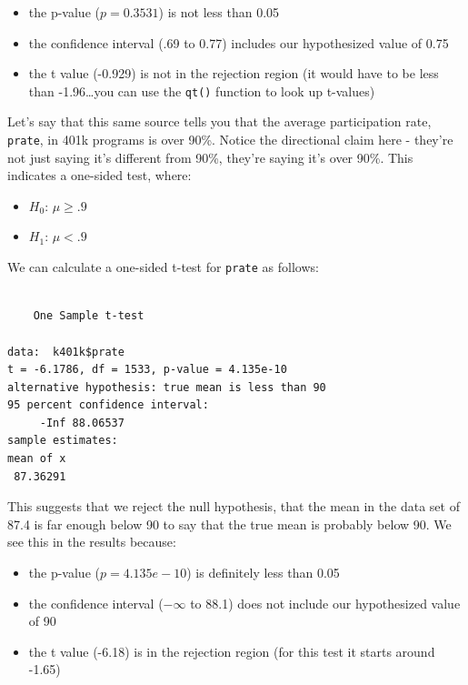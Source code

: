 \documentclass[
  letterpaper,
]{book}
\newenvironment{Shaded}{\begin{snugshade}}{\end{snugshade}}
\newcommand{\AttributeTok}[1]{\textcolor[rgb]{0.40,0.45,0.13}{#1}}
\newcommand{\DecValTok}[1]{\textcolor[rgb]{0.68,0.00,0.00}{#1}}
\newcommand{\FunctionTok}[1]{\textcolor[rgb]{0.28,0.35,0.67}{#1}}
\newcommand{\NormalTok}[1]{\textcolor[rgb]{0.00,0.23,0.31}{#1}}
\newcommand{\SpecialCharTok}[1]{\textcolor[rgb]{0.37,0.37,0.37}{#1}}
\newcommand{\StringTok}[1]{\textcolor[rgb]{0.13,0.47,0.30}{#1}}
\providecommand{\tightlist}{%
  \setlength{\itemsep}{0pt}\setlength{\parskip}{0pt}}\usepackage{longtable,booktabs,array}
\begin{document}
\begin{itemize}
\tightlist
\item
  the p-value (\(p=0.3531\)) is not less than 0.05
\item
  the confidence interval (.69 to 0.77) includes our hypothesized value
  of 0.75
\item
  the t value (-0.929) is not in the rejection region (it would have to
  be less than -1.96\ldots you can use the \texttt{qt()} function to
  look up t-values)
\end{itemize}

Let's say that this same source tells you that the average participation
rate, \texttt{prate}, in 401k programs is over 90\%. Notice the
directional claim here - they're not just saying it's different from
90\%, they're saying it's over 90\%. This indicates a one-sided test,
where:

\begin{itemize}
\tightlist
\item
  \(H_0\): \(\mu \geq .9\)
\item
  \(H_1\): \(\mu < .9\)
\end{itemize}

We can calculate a one-sided t-test for \texttt{prate} as follows:

\begin{Shaded}
\end{Shaded}

\begin{verbatim}

    One Sample t-test

data:  k401k$prate
t = -6.1786, df = 1533, p-value = 4.135e-10
alternative hypothesis: true mean is less than 90
95 percent confidence interval:
     -Inf 88.06537
sample estimates:
mean of x 
 87.36291 
\end{verbatim}

This suggests that we reject the null hypothesis, that the mean in the
data set of 87.4 is far enough below 90 to say that the true mean is
probably below 90. We see this in the results because:

\begin{itemize}
\tightlist
\item
  the p-value (\(p=4.135e-10\)) is definitely less than 0.05
\item
  the confidence interval (\(-\infty\) to 88.1) does not include our
  hypothesized value of 90
\item
  the t value (-6.18) is in the rejection region (for this test it
  starts around -1.65)
\end{itemize}
\end{document}

